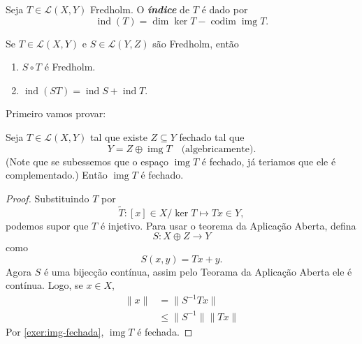 \documentclass[portuguese]{article}
\theoremstyle{definition}
\DeclareMathOperator{\img}{img}
\begin{document}
\begin{defn}
	Seja $T\in\mathcal{L}(X,Y)$ Fredholm. O \textbf{\textit{índice}} de $T$ é dado por
	\[\operatorname{ind}(T)=\dim\ker T-\operatorname{codim}\img T.\]
\end{defn}
\begin{teo}\label{teo:fredholm-conditions}
	Se $T\in\mathcal{L}(X,Y)$ e $S\in\mathcal{L}(Y,Z)$ são Fredholm, então
	\begin{enumerate}
		\item $S\circ T$ é Fredholm.
		\item $\operatorname{ind}(ST)=\operatorname{ind}S 
		+\operatorname{ind}T$.
	\end{enumerate}
\end{teo}
Primeiro vamos provar:
\begin{prop}
	Seja $T\in\mathcal{L}(X,Y)$ tal que existe $Z\subseteq Y$ fechado tal que
	\[Y=Z\oplus\img T\quad\text{(algebricamente)}.\]
	(Note que se subessemos que o espaço $\img T$ é fechado, já teriamos que ele é complementado.) Então $\img T$ é fechado.
\end{prop}
\begin{proof}
	Substituindo $T$ por 
	\[\tilde{T}:[x]\in X/\ker T\mapsto Tx\in Y,\]
	podemos supor que $T$ é injetivo. Para usar o teorema da Aplicação Aberta, defina
	\[S:X\oplus Z\to Y\]
	como
	\[S(x,y)=Tx+y.\]
	Agora $S$ é uma bijecção contínua, assim pelo Teorama da Aplicação Aberta ele é contínua. Logo, se $x\in X$,
	\begin{align*}
		\|x\|&=\|S^{-1}Tx\|\\
		&\leq\|S^{-1}\|\|Tx\|
	\end{align*}
	Por \cref{exer:img-fechada}, $\img T$ é fechada.
\end{proof}
\end{document}
